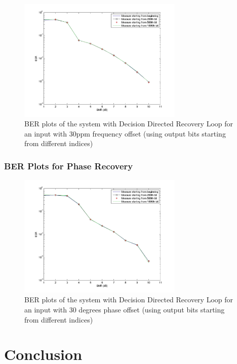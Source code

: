 \documentclass[]{article}
\begin{document}
\begin{figure}[H]
\centering
\hspace*{-2cm}\includegraphics[width=0.7\textwidth]{qpBERfo_ddr2.jpg}
\caption{BER plots of the system with Decision Directed Recovery Loop for an input with 30ppm frequency offset (using output bits starting from different indices)}
\end{figure}

\subsubsection{BER Plots for Phase Recovery}
\begin{figure}[H]
\centering
\hspace*{-2cm}\includegraphics[width=0.7\textwidth]{qpBERpo_ddr1.jpg}
\caption{BER plots of the system with Decision Directed Recovery Loop for an input with 30 degrees phase offset (using output bits starting from different indices)}
\end{figure}



\newpage
\section{Conclusion}
\label{sec:conc}
\end{document}
